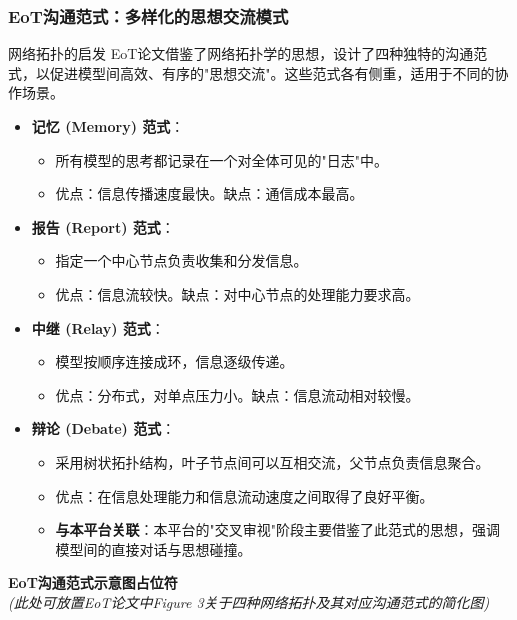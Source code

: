 \documentclass[aspectratio=169]{beamer} %
\begin{document}
\begin{frame}[allowframebreaks]
\frametitle{EoT沟通范式：多样化的思想交流模式}
\begin{block}{网络拓扑的启发}
    EoT论文借鉴了网络拓扑学的思想，设计了四种独特的沟通范式，以促进模型间高效、有序的"思想交流"。这些范式各有侧重，适用于不同的协作场景。
\end{block}

\begin{itemize}
    \item \textbf{记忆 (Memory) 范式}：
    \begin{itemize}
        \item 所有模型的思考都记录在一个对全体可见的"日志"中。
        \item 优点：信息传播速度最快。缺点：通信成本最高。
    \end{itemize}
    \item \textbf{报告 (Report) 范式}：
    \begin{itemize}
        \item 指定一个中心节点负责收集和分发信息。
        \item 优点：信息流较快。缺点：对中心节点的处理能力要求高。
    \end{itemize}
\end{itemize}
\framebreak

\begin{itemize}
    \item \textbf{中继 (Relay) 范式}：
    \begin{itemize}
        \item 模型按顺序连接成环，信息逐级传递。
        \item 优点：分布式，对单点压力小。缺点：信息流动相对较慢。
    \end{itemize}
    \item \textbf{辩论 (Debate) 范式}：
    \begin{itemize}
        \item 采用树状拓扑结构，叶子节点间可以互相交流，父节点负责信息聚合。
        \item 优点：在信息处理能力和信息流动速度之间取得了良好平衡。
        \item \textbf{与本平台关联}：本平台的"交叉审视"阶段主要借鉴了此范式的思想，强调模型间的直接对话与思想碰撞。
    \end{itemize}
\end{itemize}
\begin{center}
    \vspace{0.5cm}
    \textbf{EoT沟通范式示意图占位符}\\
    \textit{(此处可放置EoT论文中Figure 3关于四种网络拓扑及其对应沟通范式的简化图)}
\end{center}
\end{frame}
\end{document}

